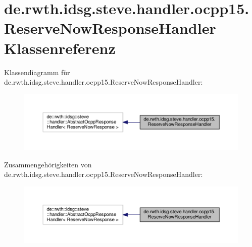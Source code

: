 \hypertarget{classde_1_1rwth_1_1idsg_1_1steve_1_1handler_1_1ocpp15_1_1_reserve_now_response_handler}{\section{de.\-rwth.\-idsg.\-steve.\-handler.\-ocpp15.\-Reserve\-Now\-Response\-Handler Klassenreferenz}
\label{classde_1_1rwth_1_1idsg_1_1steve_1_1handler_1_1ocpp15_1_1_reserve_now_response_handler}
}


Klassendiagramm für de.\-rwth.\-idsg.\-steve.\-handler.\-ocpp15.\-Reserve\-Now\-Response\-Handler\-:\nopagebreak
\begin{figure}[H]
\begin{center}
\leavevmode
\includegraphics[width=350pt]{classde_1_1rwth_1_1idsg_1_1steve_1_1handler_1_1ocpp15_1_1_reserve_now_response_handler__inherit__graph}
\end{center}
\end{figure}


Zusammengehörigkeiten von de.\-rwth.\-idsg.\-steve.\-handler.\-ocpp15.\-Reserve\-Now\-Response\-Handler\-:\nopagebreak
\begin{figure}[H]
\begin{center}
\leavevmode
\includegraphics[width=350pt]{classde_1_1rwth_1_1idsg_1_1steve_1_1handler_1_1ocpp15_1_1_reserve_now_response_handler__coll__graph}
\end{center}
\end{figure}
